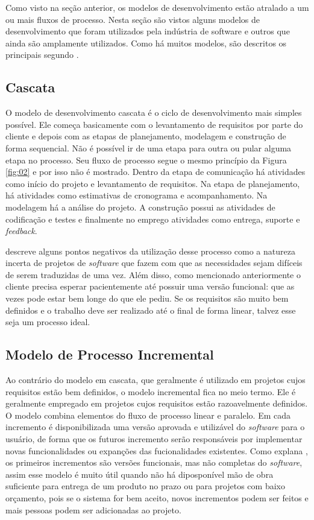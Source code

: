 Como visto na seção anterior, os modelos de desenvolvimento estão atralado a um ou mais fluxos de processo. Nesta seção são vistos alguns modelos de desenvolvimento que foram utilizados pela indústria de software e outros que ainda são amplamente utilizados. Como há muitos modelos, são descritos os principais segundo .

\subsection{Cascata}

O modelo de desenvolvimento cascata é o ciclo de desenvolvimento mais simples possível. Ele começa basicamente com o levantamento de requisitos por parte do cliente e depois com as etapas de planejamento, modelagem e construção de forma sequencial. Não é possível ir de uma etapa para outra ou pular alguma etapa no processo. Seu fluxo de processo segue o mesmo princípio da Figura \ref{fig:02} e por isso não é mostrado. Dentro da etapa de comunicação há atividades como início do projeto e levantamento de requisitos. Na etapa de planejamento, há atividades como estimativas de cronograma e acompanhamento. Na modelagem há a análise do projeto. A construção possui as atividades de codificação e testes e finalmente no emprego atividades como entrega, suporte e \textit{feedback}.

 descreve alguns pontos negativos da utilização desse processo como a natureza incerta de projetos de \textit{software} que fazem com que as necessidades sejam difíceis de serem traduzidas de uma vez. Além disso, como mencionado anteriormente o cliente precisa esperar pacientemente até possuir uma versão funcional: que as vezes pode estar bem longe do que ele pediu. Se os requisitos são muito bem definidos e o trabalho deve ser realizado até o final de forma linear, talvez esse seja um processo ideal. 

\subsection{Modelo de Processo Incremental}

Ao contrário do modelo em cascata, que geralmente é utilizado em projetos cujos requisitos estão bem definidos, o modelo incremental fica no meio termo. Ele é geralmente empregado em projetos cujos requisitos estão razoavelmente definidos. O modelo combina elementos do fluxo de processo linear e paralelo. Em cada incremento é disponibilizada uma versão aprovada e utilizável do \textit{software} para o usuário, de forma que os futuros incremento serão responsáveis por implementar novas funcionalidades ou expanções das fucionalidades existentes. Como explana , os primeiros incrementos são versões funcionais, mas não completas do \textit{software}, assim esse modelo é muito útil quando não há diposponível mão de obra suficiente para entrega de um produto no prazo ou para projetos com baixo orçamento, pois se o sistema for bem aceito, novos incrementos podem ser feitos e mais pessoas podem ser adicionadas ao projeto.


